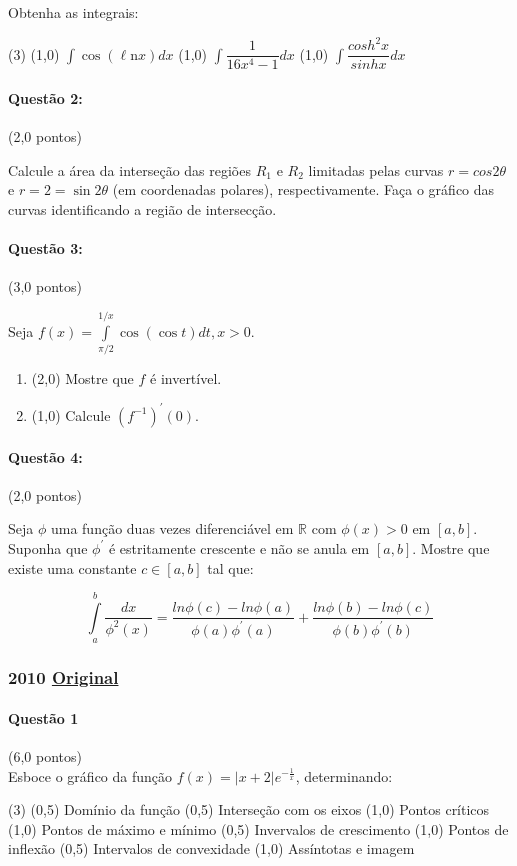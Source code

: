 \documentclass[12pt,a4paper]{article}
\newcommand{\modu}[1]{\vert #1 \vert}
\newcommand{\Ln}{\ell\mathrm{n}}
\newcommand{\original}[1]{\tiny \href{#1}{Original} \normalsize}
\begin{document}
Obtenha as integrais: 

\begin{tasks}(3)
\task (1,0) $\displaystyle\int\cos(\Ln x)dx$ 
\task (1,0) $\displaystyle\int \dfrac{1}{16x^4-1}dx$ 
\task (1,0) $\displaystyle\int \dfrac{cosh^2x}{sinhx}dx$
\end{tasks}

\paragraph{Questão 2:} (2,0 pontos)

Calcule a área da interseção das regiões $R_1$ e $R_2$ limitadas pelas curvas $r=cos2\theta$ e $r=2=\sin 2\theta$ (em coordenadas polares), respectivamente. Faça o gráfico das curvas identificando a região de intersecção.

\paragraph{Questão 3:} (3,0 pontos)

Seja $f(x)=\displaystyle\int\limits_{\pi/2}^{1/x}\cos(\cos t)dt,x>0$.

\begin{enumerate}[label=(\alph*)]
\item (2,0) Mostre que $f$ é invertível.
\item (1,0) Calcule $(f^{-1})^\prime(0)$.
\end{enumerate}

\paragraph{Questão 4:} (2,0 pontos) 

Seja $\phi$ uma função duas vezes diferenciável em $\mathbb{R}$ com $\phi(x)>0$ em $[a,b]$. Suponha que $\phi ^\prime$ é estritamente crescente e não se anula em $[a,b]$. Mostre que existe uma constante $c \in [a,b]$ tal que:

$$ \int\limits_{a}^{b} \dfrac{dx}{\phi ^2(x)} = \dfrac{ln\phi(c)-ln\phi(a)}{\phi(a)\phi^\prime(a)}+\dfrac{ln\phi(b)-ln\phi(c)}{\phi(b)\phi^\prime(b)}$$

\newpage
\subsubsection{2010 \original{https://drive.google.com/open?id=17aFbxZ6NOGf853zbG9APxFYc2Ix9EJNC}}

\paragraph{Questão 1} (6,0 pontos)\\
Esboce o gráfico da função $f(x) = \modu{x+2}e^{-\frac{1}{x}}$, determinando:
\scriptsize\begin{tasks}(3)
\task (0,5) Domínio da função
\task (0,5) Interseção com os eixos
\task (1,0) Pontos críticos
\task (1,0) Pontos de máximo e mínimo
\task (0,5) Invervalos de crescimento
\task (1,0) Pontos de inflexão
\task (0,5) Intervalos de convexidade
\task (1,0) Assíntotas e imagem
\end{tasks}
\normalsize
\end{document}
